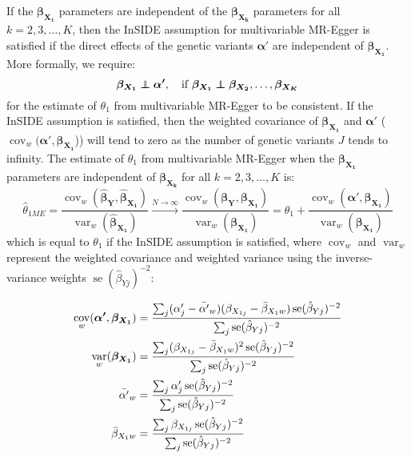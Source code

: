 \documentclass[a4paper,12pt]{article}
\DeclareMathOperator{\se}{se} %
\DeclareMathOperator{\cov}{cov}
\DeclareMathOperator{\var}{var}
\newcommand\independent{\protect\mathpalette{\protect\independenT}{\perp}}
\def\independenT#1#2{\mathrel{\rlap{$#1#2$}\mkern2mu{#1#2}}}
\begin{document}
\begin{bibunit}[wileyj]
If the $\boldsymbol{\beta_{X_{1}}}$ parameters are independent of the $\boldsymbol{\beta_{X_{k}}}$ parameters for all $k = 2, 3, \ldots, K$, then the InSIDE assumption for multivariable MR-Egger is satisfied if the direct effects of the genetic variants $\boldsymbol{\alpha'}$ are independent of $\boldsymbol{\beta_{X_{1}}}$.  More formally, we require: 
\begin{equation}
\boldsymbol{\beta_{X_{1}}} \independent \boldsymbol{\alpha'}, \quad \mbox{if }  \boldsymbol{\beta_{X_{1}}} \independent \boldsymbol{\beta_{X_{2}}}, \ldots, \boldsymbol{\beta_{X_{K}}}
\end{equation}
for the estimate of $\theta_1$ from multivariable MR-Egger to be consistent. If the InSIDE assumption is satisfied, then the weighted covariance of $\boldsymbol{\beta_{X_{1}}}$ and $\boldsymbol{\alpha'}$ ($\cov_w(\boldsymbol{\alpha'}, \boldsymbol{\beta_{X_{1}}}$)) will tend to zero as the number of genetic variants $J$ tends to infinity. The estimate of $\theta_1$ from multivariable MR-Egger when the $\boldsymbol{\beta_{X_{1}}}$ parameters are independent of $\boldsymbol{\beta_{X_{k}}}$ for all $k = 2, 3, \ldots, K$ is:
\begin{equation}
\hat{\theta}_{1ME} = \frac{\cov_w(\boldsymbol{\hat{\beta}_{Y}}, \boldsymbol{\hat{\beta}_{X_{1}}})}{\var_w(\boldsymbol{\hat{\beta}_{X_{1}}})} \xrightarrow{N \rightarrow \infty} \frac{\cov_w(\boldsymbol{\beta_{Y}}, \boldsymbol{\beta_{X_{1}}})}{\var_w(\boldsymbol{\beta_{X_{1}}})} = \theta_1 + \frac{\cov_w(\boldsymbol{\alpha'}, \boldsymbol{\beta_{X_{1}}})}{\var_w(\boldsymbol{\beta_{X_{1}}})}
\label{eq:insidein}
\end{equation}
which is equal to $\theta_1$ if the InSIDE assumption is satisfied, where $\cov_w$ and $\var_w$ represent the weighted covariance and weighted variance using the inverse-variance weights $\se(\hat{\beta}_{Yj})^{-2}$:

\begin{align}
\cov_w(\boldsymbol{\alpha'}, \boldsymbol{\beta_{X_{1}}}) &= \frac{\sum_j (\alpha'_j - \bar{\alpha'}_w) (\beta_{X_{1j}} - \bar{\beta}_{X_{1}w}) \se(\hat{\beta}_{Yj})^{-2}}{\sum_j \se(\hat{\beta}_{Yj})^{-2}} \notag \\
\var_w(\boldsymbol{\beta_{X_{1}}}) &= \frac{\sum_j (\beta_{X_{1j}} - \bar{\beta}_{X_{1}w})^2 \se(\hat{\beta}_{Yj})^{-2}}{\sum_j \se(\hat{\beta}_{Yj})^{-2}} \notag \\
\bar{\alpha'}_w        &= \frac{\sum_j \alpha'_j \se(\hat{\beta}_{Yj})^{-2}}{\sum_j \se(\hat{\beta}_{Yj})^{-2}} \notag \\
\bar{\beta}_{X_{1}w}       &= \frac{\sum_j \beta_{X_{1j}} \se(\hat{\beta}_{Yj})^{-2}}{\sum_j \se(\hat{\beta}_{Yj})^{-2}} 
\end{align}


\end{bibunit}
\end{document}
